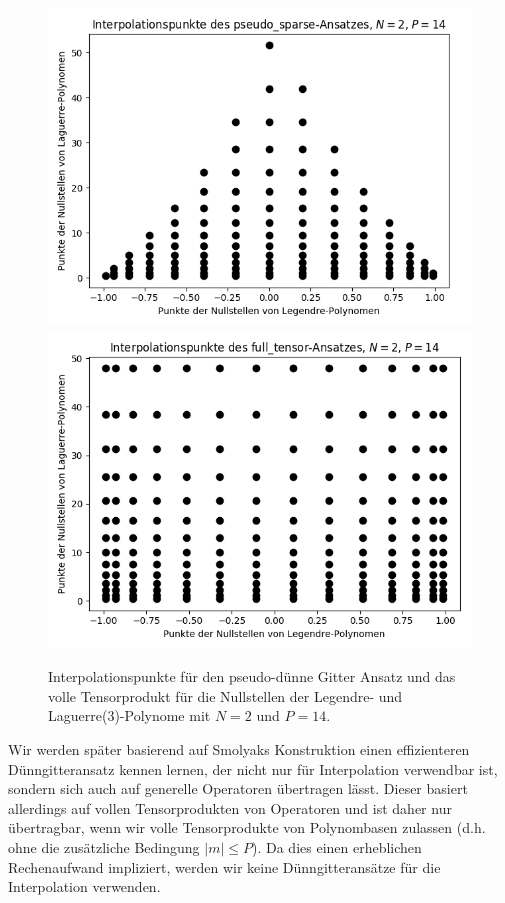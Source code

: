 \begin{figure}[!htb]
\centering
{}
  \includegraphics[width=\linewidth]{Figures/roots_pseudo_sparse.png}
\endminipage
{}
  \includegraphics[width=\linewidth]{Figures/roots_full_tensor.png}
\endminipage
\caption{Interpolationspunkte für den pseudo-dünne Gitter Ansatz und das volle Tensorprodukt für die Nullstellen der Legendre- und Laguerre(3)-Polynome mit $N=2$ und $P=14$.}
\label{fig:roots_two_dim}
\end{figure}

Wir werden später basierend auf Smolyaks Konstruktion einen effizienteren Dünngitteransatz kennen lernen, der nicht nur für Interpolation verwendbar ist, sondern sich auch auf generelle Operatoren übertragen lässt. Dieser basiert allerdings auf vollen Tensorprodukten von Operatoren und ist daher nur übertragbar, wenn wir volle Tensorprodukte von Polynombasen zulassen (d.h. ohne die zusätzliche Bedingung $|m|\le P$). Da dies einen erheblichen Rechenaufwand impliziert, werden wir keine Dünngitteransätze für die Interpolation verwenden.
